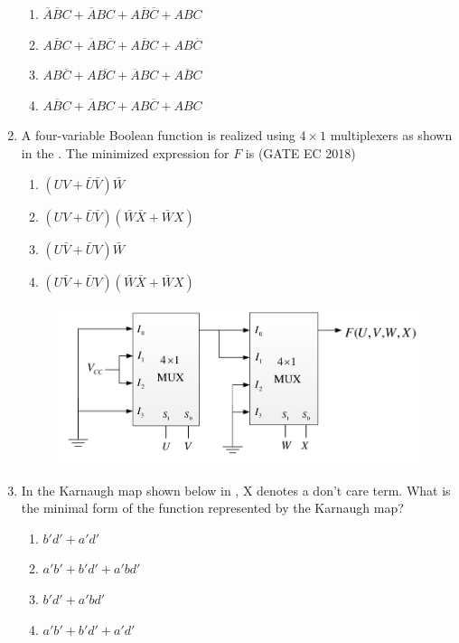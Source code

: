 \begin{enumerate}[label=\arabic*.,ref=\theenumi]
\begin{enumerate}
            \item$\overline{A}\overline{B}C+\overline{A}BC+A\overline{B}\overline{C}+ABC$
            \item$\overline{ABC}+\overline{A}B\overline{C}+A\overline{B}C+AB\overline{C}$
            \item$A B\overline{C}+A\overline{B C}+\overline{A}B C+\overline{ABC}$
            \item$\overline{ABC}+\overline{A}BC+AB\overline{C}+ABC$
                  \end{enumerate}
\item
	\label{prob:gate EC 31}
	A four-variable Boolean function is realized using $4\times 1$ multiplexers as shown in the 
        .
   The minimized expression for $F$ is
    \hfill(GATE EC 2018)
    \begin{enumerate}
       \item $\left ( UV+\bar{U}\bar{V} \right )\bar{W}$
       \item $\left ( UV+\bar{U}\bar{V} \right )\left ( \bar{W}\bar{X}+\bar{W}X\right )$
       \item $\left ( U\bar{V}+\bar{U}V \right )\bar{W}$
       \item $\left ( U\bar{V}+\bar{U}V \right )\left ( \bar{W}\bar{X}+\bar{W}X\right )$
    \end{enumerate}
    \begin{figure}[H]
        \centering
        \includegraphics[width=0.75\columnwidth]{figs/2018-gate-ec-31.png}
        \caption{}
        \label{fig:mux}
    \end{figure}
    \item 
  \label{prob:gate  CS-5}
In the Karnaugh map shown below in , X denotes a don't care term. What is the minimal form of the function represented by the Karnaugh map?
\begin{enumerate}
  \item $ b'd'+a'd' $
  \item $ a'b'+b'd'+a'bd' $
  \item $ b'd'+a'bd' $
  \item $ a'b'+b'd'+a'd' $

\end{enumerate}
\end{enumerate}
